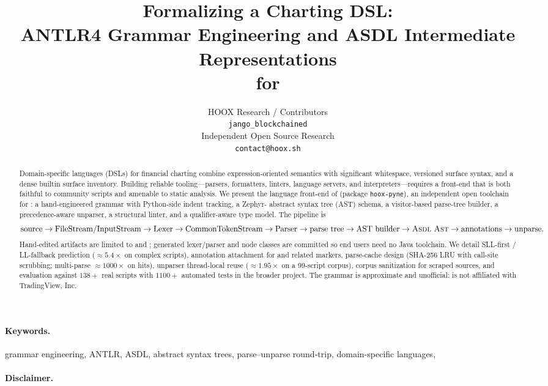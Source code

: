 \documentclass[11pt,a4paper]{article}
\title{%
  Formalizing a Charting DSL:\\
  \large ANTLR4 Grammar Engineering and ASDL Intermediate Representations\\
  for \pine{}
}
\author{%
  HOOX Research / \pyne{} Contributors\\
  \texttt{jango\_blockchained}\\
  Independent Open Source Research\\
  \texttt{contact@hoox.sh}
}
\date{}
\begin{document}
\maketitle

\begin{abstract}
Domain-specific languages (DSLs) for financial charting combine expression-oriented
semantics with significant whitespace, versioned surface syntax, and a dense
builtin surface inventory. Building reliable tooling---parsers, formatters, linters,
language servers, and interpreters---requires a front-end that is both faithful to
community scripts and amenable to static analysis.
We present the language front-end of \pyne{} (package \texttt{hoox-pyne}), an
independent open toolchain for \pine{}: a hand-engineered \antlr{} grammar with
Python-side indent tracking, a Zephyr-\asdl{} abstract syntax tree (AST) schema,
a visitor-based parse-tree builder, a precedence-aware unparser, a structural
linter, and a qualifier-aware type model.
The pipeline is
\[
  \text{source}
  \to \text{FileStream/InputStream}
  \to \text{Lexer}
  \to \text{CommonTokenStream}
  \to \text{Parser}
  \to \text{parse tree}
  \to \text{AST builder}
  \to \textsc{Asdl}{}\ \textsc{Ast}
  \to \text{annotations}
  \to \text{unparse}.
\]
Hand-edited artifacts are limited to  and
; generated lexer/parser and node classes are
committed so end users need no Java toolchain.
We detail SLL-first / LL-fallback prediction (\(\approx 5.4\times\) on complex
scripts), annotation attachment for  and related markers,
parse-cache design (SHA-256 LRU with call-site scrubbing; multi-parse
\(\approx 1000\times\) on hits), unparser thread-local reuse
(\(\approx 1.95\times\) on a 99-script corpus), corpus sanitization for scraped
sources, and evaluation against \(138+\) real scripts with \(1100+\) automated
tests in the broader project.
The grammar is approximate and unofficial: \pyne{} is not affiliated with
TradingView, Inc.
\end{abstract}

\paragraph{Keywords.}
grammar engineering, ANTLR, ASDL, abstract syntax trees, parse--unparse
round-trip, domain-specific languages, \pine{}

\paragraph{Disclaimer.}
\trademarknote{}
\end{document}

